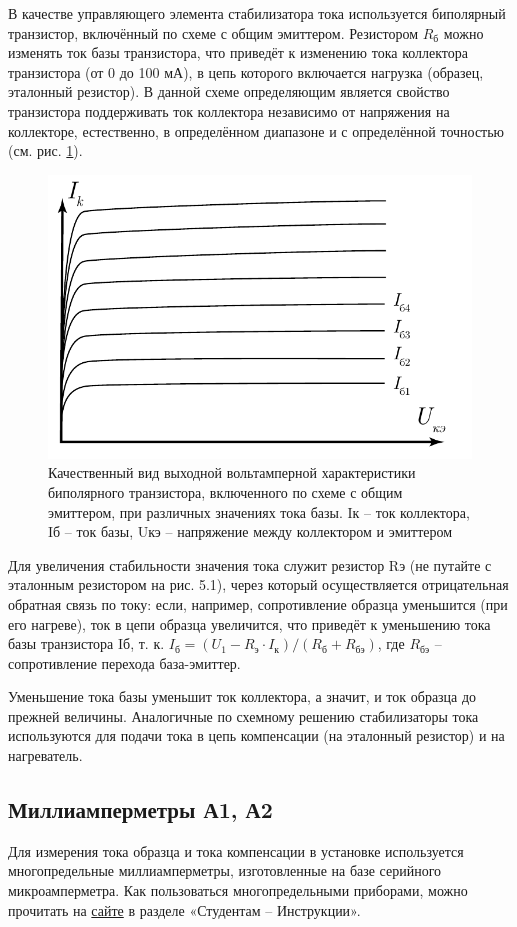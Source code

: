 		В качестве управляющего элемента стабилизатора тока используется биполярный транзистор, включённый по схеме с общим
		эмиттером. Резистором $R_\text{б}$ можно изменять ток базы транзистора, что приведёт к изменению тока коллектора
		транзистора (от 0 до 100 мА), в цепь которого включается нагрузка (образец, эталонный резистор). В данной схеме
		определяющим является свойство транзистора поддерживать ток коллектора независимо от напряжения на коллекторе,
		естественно, в определённом диапазоне и с определённой точностью (см. рис. \ref{fig:6.4}).
		\begin{figure}[h!]
			\centering
			\includegraphics[width = .5\linewidth]{img/61}
			\caption{Качественный вид выходной вольтамперной характеристики биполярного транзистора, включенного по схеме с
				общим эмиттером, при различных значениях тока базы. Iк – ток коллектора, Iб – ток базы, Uкэ – напряжение между коллектором и эмиттером}
			\label{fig:6.4}
		\end{figure}
		Для увеличения стабильности значения тока служит резистор Rэ (не путайте с эталонным резистором на рис. 5.1), через
		который осуществляется отрицательная обратная связь по току: если, например, сопротивление образца уменьшится (при его
		нагреве), ток в цепи образца увеличится, что приведёт к уменьшению тока базы транзистора Iб, т. к.
		$I_\text{б} = (U_1 - R_\text{э} \cdot I_\text{к}) / (R_\text{б} + R_\text{бэ})$, где $R_\text{бэ}$ – сопротивление перехода база-эмиттер.
		
		Уменьшение тока базы уменьшит ток коллектора, а значит, и ток образца до прежней величины.
		Аналогичные по схемному решению стабилизаторы тока используются для подачи тока в цепь компенсации (на эталонный
		резистор) и на нагреватель.
		
		\subsection{Миллиамперметры А1, А2}
		Для измерения тока образца и тока компенсации в установке используется многопредельные миллиамперметры, изготовленные на
		базе серийного микроамперметра. Как пользоваться многопредельными приборами, можно прочитать на
		\href{http://www.rf.unn.ru/eledep/}{сайте} в разделе «Студентам – Инструкции».
		
